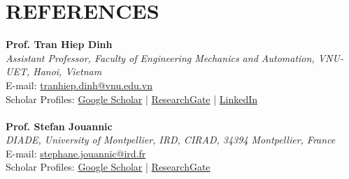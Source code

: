 \documentclass[a4paper,9pt]{extarticle}
\begin{document}
\section*{REFERENCES}
\label{sec:references}
\textbf{Prof. Tran Hiep Dinh}\\
\textit{Assistant Professor, Faculty of Engineering Mechanics and Automation, VNU-UET, Hanoi, Vietnam}\\
E-mail: \href{mailto:tranhiep.dinh@vnu.edu.vn}{tranhiep.dinh@vnu.edu.vn}\\
Scholar Profiles: \href{https://scholar.google.com/citations?user=fJYX_zsAAAAJ&hl=en&oi=ao}{Google Scholar} | \href{https://www.researchgate.net/profile/Tran-Hiep-Dinh}{ResearchGate} | \href{https://www.linkedin.com/in/tran-hiep-dinh/}{LinkedIn}\\ \\
\textbf{Prof. Stefan Jouannic}\\
\textit{DIADE, University of Montpellier, IRD, CIRAD, 34394 Montpellier, France}\\
E-mail: \href{mailto:stephane.jouannic@ird.fr}{stephane.jouannic@ird.fr}\\
Scholar Profiles: \href{https://scholar.google.com/citations?user=y5kP-ZAAAAAJ&hl=vi}{Google Scholar} | \href{https://www.researchgate.net/profile/Stefan-Jouannic}{ResearchGate}\\ \\

\end{document}
